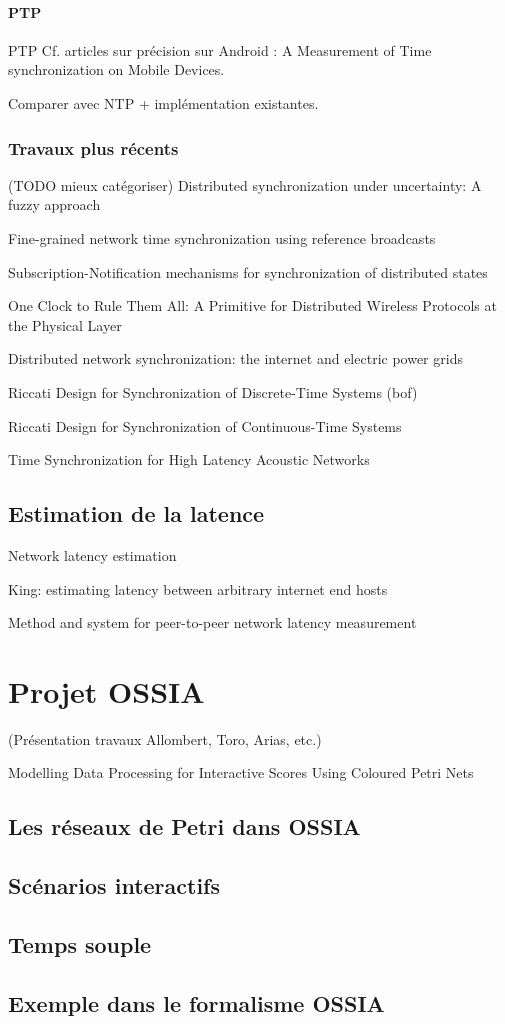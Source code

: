 \paragraph{PTP}
\ac{PTP}
Cf. articles sur précision sur Android : 
A Measurement of Time synchronization on Mobile Devices.

Comparer avec NTP + implémentation existantes.

\subsubsection{Travaux plus récents}
(TODO mieux catégoriser)
Distributed synchronization under uncertainty: A fuzzy approach

Fine-grained network time synchronization using reference broadcasts

Subscription-Notification mechanisms for synchronization of distributed states

One Clock to Rule Them All: A Primitive for Distributed Wireless Protocols at the Physical Layer

Distributed network synchronization: the internet and electric power grids

Riccati Design for Synchronization of Discrete-Time Systems (bof)

Riccati Design for Synchronization of Continuous-Time Systems

Time Synchronization for High Latency Acoustic Networks


\subsection{Estimation de la latence}
\label{section:latence}
Network latency estimation %

King: estimating latency between arbitrary internet end hosts

Method and system for peer-to-peer network latency measurement %


\section{Projet OSSIA}
(Présentation travaux Allombert, Toro, Arias, etc.)

Modelling Data Processing for Interactive Scores Using Coloured Petri Nets
\subsection{Les réseaux de Petri dans OSSIA}
\subsection{Scénarios interactifs}
\subsection{Temps souple}
\subsection{Exemple dans le formalisme OSSIA}

